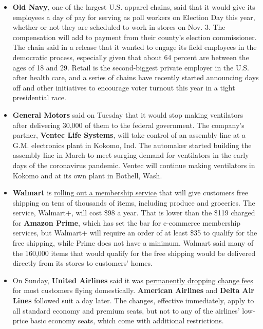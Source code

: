 \begin{itemize}
\item
  \textbf{Old Navy}, one of the largest U.S. apparel chains, said that
  it would give its employees a day of pay for serving as poll workers
  on Election Day this year, whether or not they are scheduled to work
  in stores on Nov. 3. The compensation will add to payment from their
  county's election commissioner. The chain said in a release that it
  wanted to engage its field employees in the democratic process,
  especially given that about 64 percent are between the ages of 18 and
  29. Retail is the second-biggest private employer in the U.S. after
  health care, and a series of chains have recently started announcing
  days off and other initiatives to encourage voter turnout this year in
  a tight presidential race.
\item
  \textbf{General Motors} said on Tuesday that it would stop making
  ventilators after delivering 30,000 of them to the federal government.
  The company's partner, \textbf{Ventec Life Systems}, will take control
  of an assembly line at a G.M. electronics plant in Kokomo, Ind. The
  automaker started building the assembly line in March to meet surging
  demand for ventilators in the early days of the coronavirus pandemic.
  Ventec will continue making ventilators in Kokomo and at its own plant
  in Bothell, Wash.
\item
  \textbf{Walmart} is
  \href{https://www.nytimes3xbfgragh.onion/2020/09/01/business/walmart-plus-membership.html}{rolling
  out a membership service} that will give customers free shipping on
  tens of thousands of items, including produce and groceries. The
  service, Walmart+, will cost \$98 a year. That is lower than the \$119
  charged for \textbf{Amazon Prime}, which has set the bar for
  e-commerce membership services, but Walmart+ will require an order of
  at least \$35 to qualify for the free shipping, while Prime does not
  have a minimum. Walmart said many of the 160,000 items that would
  qualify for the free shipping would be delivered directly from its
  stores to customers' homes.
\item
  On Sunday, \textbf{United Airlines} said it was
  \href{https://www.nytimes3xbfgragh.onion/live/2020/08/31/business/stock-market-today-coronavirus\#delta-and-american-follow-united-in-permanently-dropping-some-change-fees}{permanently
  dropping change fees} for most customers flying domestically.
  \textbf{American Airlines} and \textbf{Delta Air Lines} followed suit
  a day later. The changes, effective immediately, apply to all standard
  economy and premium seats, but not to any of the airlines' low-price
  basic economy seats, which come with additional restrictions.
\end{itemize}

